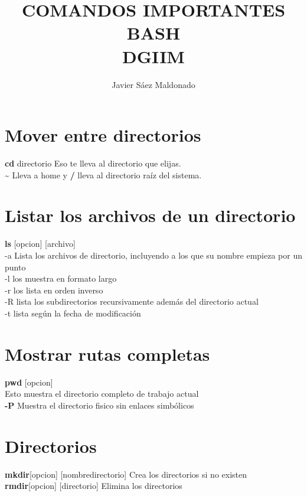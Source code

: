 \documentclass[11pt]{article}
\title{\textbf{COMANDOS IMPORTANTES BASH\\ DGIIM}}
\author{Javier S\'aez Maldonado}
\date{}
\begin{document}
\maketitle

\section{Mover entre directorios}
\textbf{cd} directorio
Eso te lleva al directorio que elijas.\\
\textbf{\~}  Lleva a home y \textbf{/} lleva al directorio ra\'iz del sistema.

\section{Listar los archivos de un directorio}
\textbf{ls} [opcion]  [archivo] \\


-a \hspace{2cm} Lista los archivos de directorio, incluyendo a los que su nombre empieza por un punto
\\

-l \hspace{2cm} los muestra en formato largo
\\

-r \hspace{2cm} los lista en orden inverso
\\

-R \hspace{2cm} lista los subdirectorios recursivamente además del direc\hspace{2cm}torio actual
\\

-t \hspace{2cm} lista según la fecha de modificación

\section{Mostrar rutas completas}
\textbf{pwd} [opcion]\\
Esto muestra el directorio completo de trabajo actual\\

\hspace{0.5cm} \textbf{-P} \hspace{2cm} Muestra el directorio fisico sin enlaces simbólicos

\section{Directorios}
\textbf{mkdir}[opcion] [nombredirectorio] \hspace{2cm} Crea los directorios si no existen\\
\textbf{rmdir}[opcion] [directorio] \hspace{2cm} Elimina los directorios\\
\end{document}
